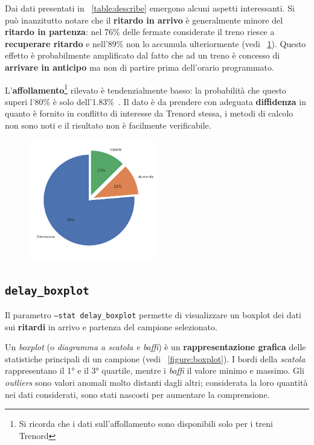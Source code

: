 \documentclass[12pt,italian]{report}
\begin{document}
Dai dati presentati in \tablename~\ref{table:describe} emergono alcuni
aspetti interessanti.  Si può inanzitutto notare che il
\textbf{ritardo in arrivo} è generalmente minore del \textbf{ritardo
    in partenza}: nel 76\% delle fermate considerate il treno riesce a
\textbf{recuperare ritardo} e nell'89\% non lo accumula ulteriormente
(vedi \figurename~\ref{figure:delay_var}).  Questo effetto è
probabilmente amplificato dal fatto che ad un treno è concesso di
\textbf{arrivare in anticipo} ma non di partire prima dell'orario
programmato.

L'\textbf{affollamento}\footnote{Si ricorda che i dati
    sull'affollamento sono disponibili solo per i treni Trenord}
rilevato è tendenzialmente basso: la probabilità che questo superi
l'80\% è solo dell'1.83\%~\cite[B]{StatJup}.  Il dato è da prendere
con adeguata \textbf{diffidenza} in quanto è fornito in conflitto di
interesse da Trenord stessa, i metodi di calcolo non sono noti e il
risultato non è facilmente verificabile.

\begin{figure}[h] \centering
    \includegraphics[width=0.5\textwidth]{images/delay_var.pdf}
    \label{figure:delay_var}
\end{figure}

\subsection{\texttt{delay\_boxplot}}
\label{stat_delay_boxplot}

Il parametro \texttt{--stat delay\_\-boxplot} permette di visualizzare
un boxplot dei dati sui \textbf{ritardi} in arrivo e partenza del
campione selezionato.

Un \textit{boxplot} (o \textit{diagramma a scatola e baffi}) è un
\textbf{rappresentazione grafica} delle statistiche principali di un
campione (vedi \figurename~\ref{figure:boxplot}).  I bordi della
\textit{scatola} rappresentano il 1° e il 3° quartile, mentre i
\textit{baffi} il valore minimo e massimo.  Gli \textit{outliers} sono
valori anomali molto distanti dagli altri; considerata la loro
quantità nei dati considerati, sono stati nascosti per aumentare la
comprensione.
\end{document}
